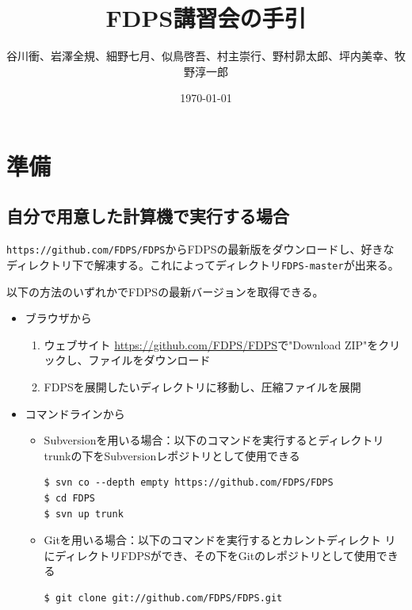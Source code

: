 \documentclass[12pt,a4paper,dvipdfmx]{jarticle}
\title{FDPS講習会の手引}
\author{谷川衝、岩澤全規、細野七月、似鳥啓吾、村主崇行、野村昴太郎、坪内美幸、牧野淳一郎}
\date{\today}
\begin{document}
\maketitle
\tableofcontents

\newpage





\section{準備}


\subsection{自分で用意した計算機で実行する場合}
\texttt{https://github.com/FDPS/FDPS}からFDPSの最新版をダウンロードし、好きな
ディレクトリ下で解凍する。これによってディレクトリ\texttt{FDPS-master}が出来る。


以下の方法のいずれかでFDPSの最新バージョンを取得できる。
\begin{itemize}
\item ブラウザから
  \begin{enumerate}
  \item ウェブサイト \url{https://github.com/FDPS/FDPS}で"Download ZIP"をクリックし、ファイルをダウンロード
  \item FDPSを展開したいディレクトリに移動し、圧縮ファイルを展開
  \end{enumerate}

\item コマンドラインから
  \begin{itemize}    
  \item Subversionを用いる場合：以下のコマンドを実行するとディレクトリ
    trunkの下をSubversionレポジトリとして使用できる
    \begin{screen}
\begin{verbatim}
$ svn co --depth empty https://github.com/FDPS/FDPS
$ cd FDPS
$ svn up trunk
\end{verbatim}
    \end{screen}

  \item Gitを用いる場合：以下のコマンドを実行するとカレントディレクト
    リにディレクトリFDPSができ、その下をGitのレポジトリとして使用できる
    \begin{screen}
\begin{verbatim}
$ git clone git://github.com/FDPS/FDPS.git
\end{verbatim}
    \end{screen}    

  \end{itemize}

\end{itemize}
\end{document}
